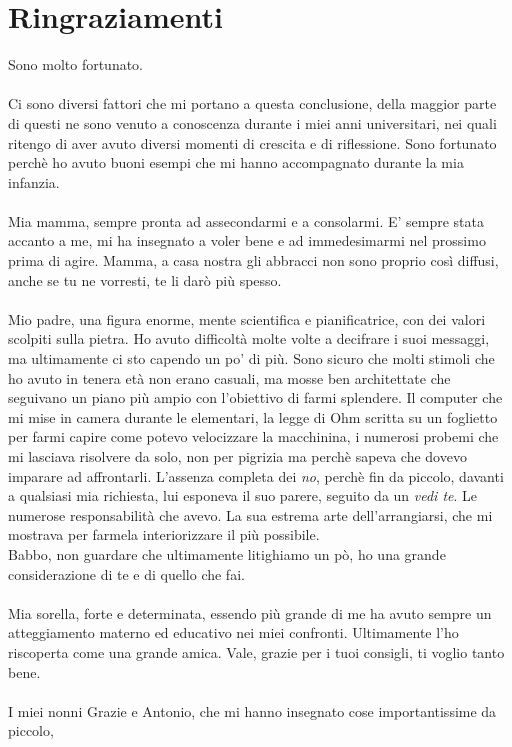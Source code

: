 \chapter{Ringraziamenti}\label{ch:ringraziamenti}
Sono molto fortunato.\\\\
 Ci sono diversi fattori che mi portano a questa conclusione, della maggior parte di questi
ne sono venuto a conoscenza durante i miei anni universitari, nei quali ritengo di aver avuto diversi momenti di crescita
e di riflessione.
Sono fortunato perchè ho avuto buoni esempi che mi hanno accompagnato durante la mia infanzia.
\\\\Mia mamma, sempre pronta ad assecondarmi e a consolarmi. E' sempre stata accanto a me, mi ha insegnato a voler bene e ad immedesimarmi nel prossimo prima di agire.
Mamma, a casa nostra gli abbracci non sono proprio così diffusi, anche se tu ne vorresti, te li darò più spesso.
\\\\Mio padre, una figura enorme, mente scientifica e pianificatrice, con dei valori scolpiti sulla pietra. Ho avuto difficoltà molte volte a decifrare i suoi messaggi,
ma ultimamente ci sto capendo un po' di più. Sono sicuro che molti stimoli che ho avuto in tenera età non erano casuali, ma mosse ben architettate
che seguivano un piano più ampio con l'obiettivo di farmi splendere. Il computer che mi mise in camera durante le elementari, la legge di Ohm scritta su un foglietto per farmi capire 
come potevo velocizzare la macchinina, i numerosi probemi che mi lasciava risolvere da solo, non per pigrizia ma perchè sapeva che dovevo imparare ad affrontarli.
 L'assenza completa dei \emph{no}, perchè fin da piccolo, davanti a qualsiasi mia richiesta, lui esponeva il suo parere, seguito da un \emph{vedi te}.
Le numerose responsabilità che avevo. La sua estrema arte dell'arrangiarsi, che mi mostrava per farmela interiorizzare il più possibile.
\\Babbo, non guardare che ultimamente litighiamo un pò, ho una grande considerazione di te e di quello che fai.
\\\\Mia sorella, forte e determinata, essendo più grande di me ha avuto sempre un atteggiamento materno ed educativo nei miei confronti. 
Ultimamente l'ho riscoperta come una grande amica.
Vale, grazie per i tuoi consigli, ti voglio tanto bene.
\\\\
I miei nonni Grazie e Antonio, che mi hanno insegnato cose importantissime da piccolo,
